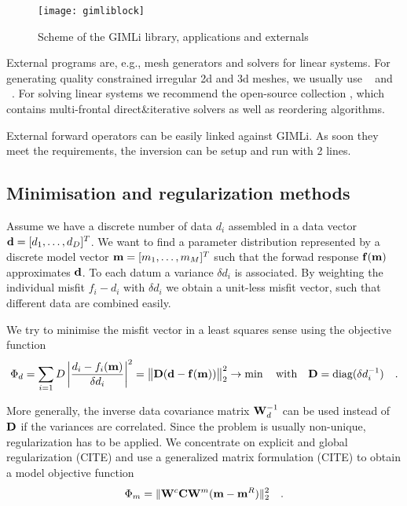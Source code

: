 \begin{figure}[htb]
\centering\texttt{[image: gimliblock]}
\caption{Scheme of the GIMLi library, applications and externals}\label{fig:gimliblock}
\end{figure} 

External programs are, e.g., mesh generators and solvers for linear systems.
For generating quality constrained irregular 2d and 3d meshes, we usually use ~\citep{triangle} and ~\citep{tetgen}.
For solving linear systems we recommend the open-source collection  \citep{davis}, which contains multi-frontal direct\&iterative solvers as well as reordering algorithms.

External forward operators can be easily linked against GIMLi.
As soon they meet the requirements, the inversion can be setup and run with 2 lines.

\subsection{Minimisation and regularization methods}\label{sec:mini}
Assume we have a discrete number of data $d_i$ assembled in a data vector $\mathbf{d}=[d_1,\ldots,d_D]^T$.
We want to find a parameter distribution represented by a discrete model vector $\mathbf{m}=[m_1,\ldots,m_M]^T$ such that the forwad response $\mathbf{f}(\mathbf{m})$ approximates $\mathbf{d}$.
To each datum a variance $\delta d_i$ is associated.
By weighting the individual misfit $f_i-d_i$ with $\delta d_i$ we obtain a unit-less misfit vector, such that different data are combined easily.

We try to minimise the misfit vector in a least squares sense using the objective function
\begin{equation}\label{eq:phid}
\Phi_d=\sum\limits_{i=1}{D} \left| \frac{d_i-f_i(\mathbf{m})}{\delta d_i} \right|^2
= \big\Vert \mathbf{D}(\mathbf{d} - \mathbf{f}(\mathbf{m})) \big\Vert^2_2 \rightarrow \min
\quad\mbox{with}\quad \mathbf{D}=\mbox{diag}(\delta d_i^{-1})\quad.
\end{equation}

More generally, the inverse data covariance matrix $\mathbf{W}_d^{-1}$ can be used instead of $\mathbf{D}$ if the variances are correlated.
Since the problem is usually non-unique, regularization has to be applied.
We concentrate on explicit and global regularization (CITE) and use a generalized matrix formulation (CITE) to obtain a model objective function 
\begin{equation}\label{eq:phim}
\Phi_m = \|\mathbf{W}^c \mathbf{C} \mathbf{W}^m (\mathbf{m}-\mathbf{m}^R)\|^2_2\quad.
\end{equation}

